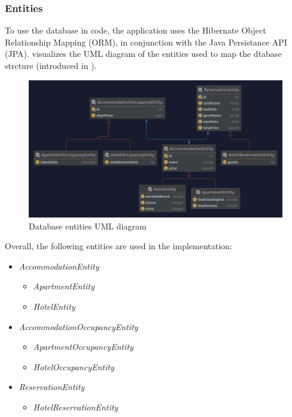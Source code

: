 \subsubsection{Entities}\label{sec:02_design_db_entities}
To use the database in code, the application uses the Hibernate Object Relationship Mapping (ORM), in conjunction with the Java Persistance API (JPA).  visualizes the UML diagram of the entities used to map the dtabase strcture (introduced in ).
\begin{figure}[h]
\centering
\includegraphics[scale=0.22]{images/02_design/design-entities}
\caption{Database entities UML diagram}
\label{fig:02_design_db_entities_uml}
\end{figure}
Overall, the following entities are used in the implementation:
\begin{itemize}
\item \textit{AccommodationEntity}
\begin{itemize}
\item \textit{ApartmentEntity}
\item \textit{HotelEntity}
\end{itemize}

\item \textit{AccommodationOccupancyEntity}
\begin{itemize}
\item \textit{ApartmentOccupancyEntity}
\item \textit{HotelOccupancyEntity}
\end{itemize}

\item \textit{ReservationEntity}
\begin{itemize}
\item \textit{HotelReservationEntity}
\end{itemize}
\end{itemize}


